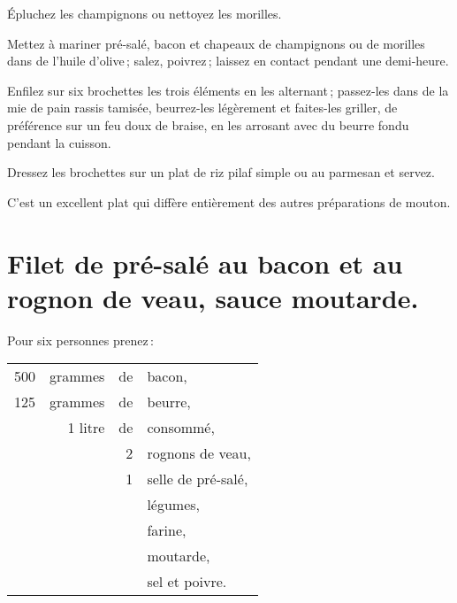 \medskip

Épluchez les champignons ou nettoyez les morilles.

Mettez à mariner pré-salé, bacon et chapeaux de champignons ou de morilles dans
de l'huile d'olive ; salez, poivrez ; laissez en contact pendant une
demi-heure.

Enfilez sur six brochettes les trois éléments en les alternant ; passez-les
dans de la mie de pain rassis tamisée, beurrez-les légèrement et faites-les
griller, de préférence sur un feu doux de braise, en les arrosant avec du
beurre fondu pendant la cuisson.

Dressez les brochettes sur un plat de riz pilaf simple ou au parmesan et servez.

C'est un excellent plat qui diffère entièrement des autres préparations de
mouton.

\section*{\centering Filet de pré-salé au bacon et au rognon de veau, sauce moutarde.}
{}

Pour six personnes prenez :

\medskip

\footnotesize
\begin{longtable}{rrrp{16em}}
    500 & grammes & de & bacon,                                                                           \\
    125 & grammes & de & beurre,                                                                          \\
        & 1 litre & de & consommé,                                                                        \\
        &         &  2 & rognons de veau,                                                                 \\
        &         &  1 & selle de pré-salé,                                                               \\
        &         &    & légumes,                                                                         \\
        &         &    & farine,                                                                          \\
        &         &    & moutarde,                                                                        \\
        &         &    & sel et poivre.                                                                   \\
\end{longtable}
\normalsize

